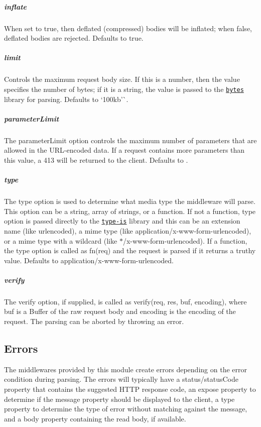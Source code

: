 \subparagraph*{inflate}

When set to {\ttfamily true}, then deflated (compressed) bodies will be inflated; when {\ttfamily false}, deflated bodies are rejected. Defaults to {\ttfamily true}.

\subparagraph*{limit}

Controls the maximum request body size. If this is a number, then the value specifies the number of bytes; if it is a string, the value is passed to the \href{https://www.npmjs.com/package/bytes}{\tt bytes} library for parsing. Defaults to `\textquotesingle{}100kb'\`{}.

\subparagraph*{parameter\+Limit}

The {\ttfamily parameter\+Limit} option controls the maximum number of parameters that are allowed in the U\+R\+L-\/encoded data. If a request contains more parameters than this value, a 413 will be returned to the client. Defaults to {}.

\subparagraph*{type}

The {\ttfamily type} option is used to determine what media type the middleware will parse. This option can be a string, array of strings, or a function. If not a function, {\ttfamily type} option is passed directly to the \href{https://www.npmjs.org/package/type-is#readme}{\tt type-\/is} library and this can be an extension name (like {\ttfamily urlencoded}), a mime type (like {\ttfamily application/x-\/www-\/form-\/urlencoded}), or a mime type with a wildcard (like {\ttfamily $\ast$/x-\/www-\/form-\/urlencoded}). If a function, the {\ttfamily type} option is called as {\ttfamily fn(req)} and the request is parsed if it returns a truthy value. Defaults to {\ttfamily application/x-\/www-\/form-\/urlencoded}.

\subparagraph*{verify}

The {\ttfamily verify} option, if supplied, is called as {\ttfamily verify(req, res, buf, encoding)}, where {\ttfamily buf} is a {\ttfamily Buffer} of the raw request body and {\ttfamily encoding} is the encoding of the request. The parsing can be aborted by throwing an error.

\subsection*{Errors}

The middlewares provided by this module create errors depending on the error condition during parsing. The errors will typically have a {\ttfamily status}/{\ttfamily status\+Code} property that contains the suggested H\+T\+TP response code, an {\ttfamily expose} property to determine if the {\ttfamily message} property should be displayed to the client, a {\ttfamily type} property to determine the type of error without matching against the {\ttfamily message}, and a {\ttfamily body} property containing the read body, if available.


